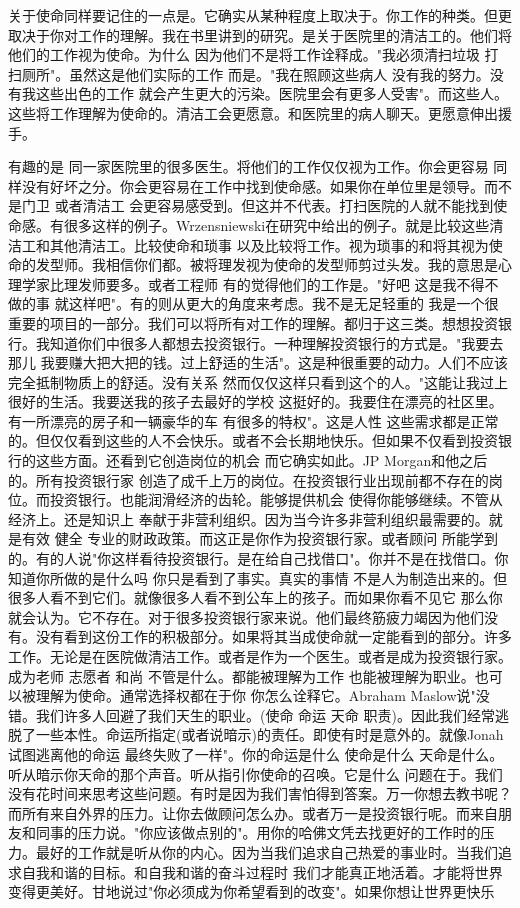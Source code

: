 关于使命同样要记住的一点是。它确实从某种程度上取决于。你工作的种类。但更取决于你对工作的理解。我在书里讲到的研究。是关于医院里的清洁工的。他们将他们的工作视为使命。为什么 因为他们不是将工作诠释成。"我必须清扫垃圾 打扫厕所"。虽然这是他们实际的工作 而是。"我在照顾这些病人 没有我的努力。没有我这些出色的工作 就会产生更大的污染。医院里会有更多人受害"。而这些人。这些将工作理解为使命的。清洁工会更愿意。和医院里的病人聊天。更愿意伸出援手。 

有趣的是 同一家医院里的很多医生。将他们的工作仅仅视为工作。你会更容易 同样没有好坏之分。你会更容易在工作中找到使命感。如果你在单位里是领导。而不是门卫 或者清洁工 会更容易感受到。但这并不代表。打扫医院的人就不能找到使命感。有很多这样的例子。Wrzensniewski在研究中给出的例子。就是比较这些清洁工和其他清洁工。比较使命和琐事 以及比较将工作。视为琐事的和将其视为使命的发型师。我相信你们都。被将理发视为使命的发型师剪过头发。我的意思是心理学家比理发师要多。或者工程师 有的觉得他们的工作是。"好吧 这是我不得不做的事 就这样吧"。有的则从更大的角度来考虑。我不是无足轻重的 我是一个很重要的项目的一部分。我们可以将所有对工作的理解。都归于这三类。想想投资银行。我知道你们中很多人都想去投资银行。一种理解投资银行的方式是。"我要去那儿 我要赚大把大把的钱。过上舒适的生活"。这是种很重要的动力。人们不应该完全抵制物质上的舒适。没有关系 然而仅仅这样只看到这个的人。"这能让我过上很好的生活。我要送我的孩子去最好的学校 这挺好的。我要住在漂亮的社区里。有一所漂亮的房子和一辆豪华的车 有很多的特权"。这是人性 这些需求都是正常的。但仅仅看到这些的人不会快乐。或者不会长期地快乐。但如果不仅看到投资银行的这些方面。还看到它创造岗位的机会 而它确实如此。JP Morgan和他之后的。所有投资银行家 创造了成千上万的岗位。在投资银行业出现前都不存在的岗位。而投资银行。也能润滑经济的齿轮。能够提供机会 使得你能够继续。不管从经济上。还是知识上 奉献于非营利组织。因为当今许多非营利组织最需要的。就是有效 健全 专业的财政政策。而这正是你作为投资银行家。或者顾问 所能学到的。有的人说"你这样看待投资银行。是在给自己找借口"。你并不是在找借口。你知道你所做的是什么吗 你只是看到了事实。真实的事情 不是人为制造出来的。但很多人看不到它们。就像很多人看不到公车上的孩子。而如果你看不见它 那么你就会认为。它不存在。对于很多投资银行家来说。他们最终筋疲力竭因为他们没有。没有看到这份工作的积极部分。如果将其当成使命就一定能看到的部分。许多工作。无论是在医院做清洁工作。或者是作为一个医生。或者是成为投资银行家。成为老师 志愿者 和尚 不管是什么。都能被理解为工作 也能被理解为职业。也可以被理解为使命。通常选择权都在于你 你怎么诠释它。Abraham Maslow说"没错。我们许多人回避了我们天生的职业。(使命 命运 天命 职责)。因此我们经常逃脱了一些本性。命运所指定(或者说暗示)的责任。即使有时是意外的。就像Jonah试图逃离他的命运 最终失败了一样"。你的命运是什么 使命是什么 天命是什么。听从暗示你天命的那个声音。听从指引你使命的召唤。它是什么 问题在于。我们没有花时间来思考这些问题。有时是因为我们害怕得到答案。万一你想去教书呢？而所有来自外界的压力。让你去做顾问怎么办。或者万一是投资银行呢。而来自朋友和同事的压力说。"你应该做点别的"。用你的哈佛文凭去找更好的工作时的压力。最好的工作就是听从你的内心。因为当我们追求自己热爱的事业时。当我们追求自我和谐的目标。和自我和谐的奋斗过程时 我们才能真正地活着。才能将世界变得更美好。甘地说过"你必须成为你希望看到的改变"。如果你想让世界更快乐 